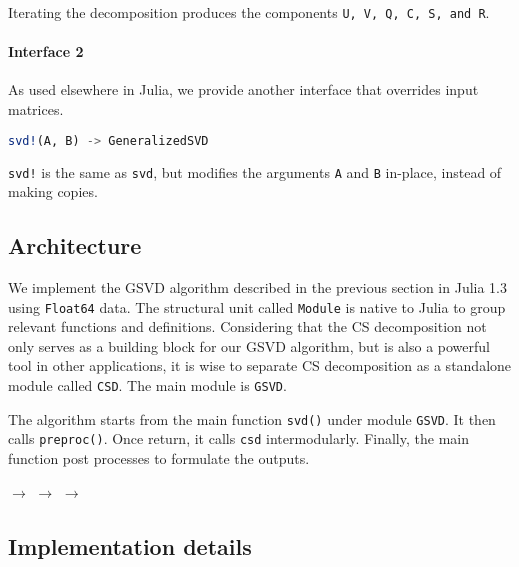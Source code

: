 Iterating the decomposition produces the components \texttt{U, V, Q, C, S, and R}. 

\paragraph{Interface 2} As used elsewhere in Julia, we provide another interface that overrides input matrices. 

\begin{lstlisting}[language=julia, style=jlcodestyle]
svd!(A, B) -> GeneralizedSVD
\end{lstlisting}

\texttt{svd!} is the same as \texttt{svd}, but modifies the arguments \texttt{A} and \texttt{B} in-place, instead of making copies.

\subsection{Architecture}
We implement the GSVD algorithm described in the previous section in Julia 1.3 using \texttt{Float64} data. The structural unit called \texttt{Module} is native to Julia to group relevant functions and definitions. Considering that the CS decomposition not only serves as a building block for our GSVD algorithm, but is also a powerful tool in other applications, it is wise to separate CS decomposition as a standalone module called \texttt{CSD}. The main module is \texttt{GSVD}.

The algorithm starts from the main function \texttt{svd()} under module \texttt{GSVD}. It then calls \texttt{preproc()}. Once return, it calls \texttt{csd} intermodularly. Finally, the main function post processes to formulate the outputs. 

\begin{center}
     $\rightarrow$  $\rightarrow$  $\rightarrow$ 
\end{center}


\subsection{Implementation details}

